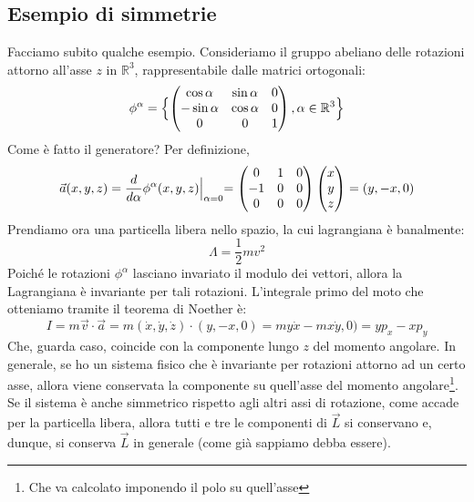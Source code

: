 \documentclass[a4paper,openany]{article}
\begin{document}
	\subsection{Esempio di simmetrie}
	Facciamo subito qualche esempio. Consideriamo il gruppo abeliano delle rotazioni attorno all'asse $z$ in $\mathbb{R}^{3}$, rappresentabile dalle matrici ortogonali:
	\begin{equation}\label{key}
		\phi^{\alpha} = \Bigl\{
		\begin{pmatrix}
			\cos\alpha & \sin\alpha & 0 \\
			-\sin\alpha & \cos\alpha & 0 \\
			0 & 0 & 1 \\
		\end{pmatrix}
		, \alpha\in\mathbb{R}^{3}\Bigl\}
	\end{equation}
	Come è fatto il generatore? Per definizione,
	\begin{equation}\label{key}
		\vec{a}(x,y,z) = \dfrac{d}{d\alpha}\phi^{\alpha}(x,y,z)\Bigl|_{\alpha = 0} = 
		\begin{pmatrix}
			0 & 1 & 0 \\
			-1 & 0 & 0 \\
			0 & 0 & 0 \\
		\end{pmatrix}
		\begin{pmatrix}
			x \\ y \\ z
		\end{pmatrix}
		= (y,-x,0)
	\end{equation}
	Prendiamo ora una particella libera nello spazio, la cui lagrangiana è banalmente:
	$$
	\Lambda = \dfrac{1}{2}mv^{2}
	$$
	Poiché le rotazioni $\phi^{\alpha}$ lasciano invariato il modulo dei vettori, allora la Lagrangiana è invariante per tali rotazioni. L'integrale primo del moto che otteniamo tramite il teorema di Noether è:
	\begin{equation}\label{key}
		I = m\vec{v}\cdot\vec{a} = m(\dot{x},\dot{y},\dot{z})\cdot(y,-x,0) = my\dot{x} - mx\dot{y}, 0) = yp_x-xp_y
	\end{equation}
	Che, guarda caso, coincide con la componente lungo $z$ del momento angolare. In generale, se ho un sistema fisico che è invariante per rotazioni attorno ad un certo asse, allora viene conservata la componente su quell'asse del momento angolare\footnote{Che va calcolato imponendo il polo su quell'asse}. Se il sistema è anche simmetrico rispetto agli altri assi di rotazione, come accade per la particella libera, allora tutti e tre le componenti di $\vec{L}$ si conservano e, dunque, si conserva $\vec{L}$ in generale (come già sappiamo debba essere).
\end{document}
